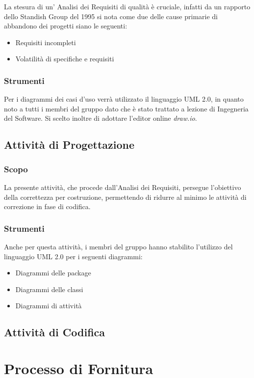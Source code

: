 			
			
			
			
			
			
			
			La stesura di un' Analisi dei Requisiti di qualità è cruciale, infatti
			da un rapporto dello Standish Group del 1995 si nota come due delle cause primarie
			di abbandono dei progetti siano le seguenti:
				\begin{itemize}
				\item Requisiti incompleti
				\item Volatilità di specifiche e requisiti
				\end{itemize}
			
			
			\subsubsection{Strumenti}
				Per i diagrammi dei casi d'uso verrà utilizzato il linguaggio UML 2.0,
				in quanto noto a tutti i membri del gruppo dato che è stato trattato a lezione
				di Ingegneria del Software.
				Si scelto inoltre di adottare l'editor online \emph{draw.io}.
			
			
		\subsection{Attività di Progettazione}
			\subsubsection{Scopo}
		     La presente attività, che procede dall'Analisi dei Requisiti, persegue l'obiettivo
		     della correttezza per costruzione, permettendo di ridurre al minimo le attività di correzione
		     in fase di codifica.
		
		 
		
		 
		 \subsubsection{Strumenti}
		 Anche per questa attività, i membri del gruppo hanno stabilito l'utilizzo del linguaggio UML 2.0 per i seguenti
		 diagrammi:
		 \begin{itemize}
			\item Diagrammi delle package  
			\item Diagrammi delle classi	
			\item Diagrammi di attività
		\end{itemize}
			 
		
		\subsection{Attività di Codifica}
		
	\section{Processo di Fornitura}
